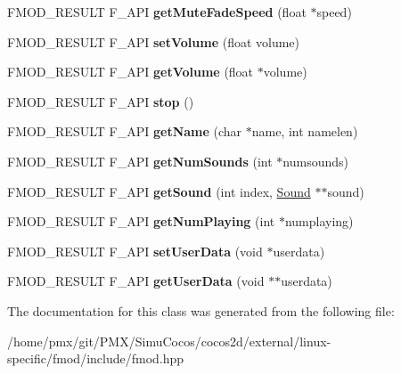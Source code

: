 \begin{DoxyCompactItemize}
\mbox{\label{classFMOD_1_1SoundGroup_aca310a25104400a3eb2988db655fe606}} 
F\+M\+O\+D\+\_\+\+R\+E\+S\+U\+LT F\+\_\+\+A\+PI {\bfseries get\+Mute\+Fade\+Speed} (float $\ast$speed)
\item 
\mbox{\label{classFMOD_1_1SoundGroup_a62bdee90b0493d4c881e6f34c7a7389d}} 
F\+M\+O\+D\+\_\+\+R\+E\+S\+U\+LT F\+\_\+\+A\+PI {\bfseries set\+Volume} (float volume)
\item 
\mbox{\label{classFMOD_1_1SoundGroup_a72cf877fa4dbc446c3b53afd84a93029}} 
F\+M\+O\+D\+\_\+\+R\+E\+S\+U\+LT F\+\_\+\+A\+PI {\bfseries get\+Volume} (float $\ast$volume)
\item 
\mbox{\label{classFMOD_1_1SoundGroup_a65f4d4a04d2f916c6287c185a2851746}} 
F\+M\+O\+D\+\_\+\+R\+E\+S\+U\+LT F\+\_\+\+A\+PI {\bfseries stop} ()
\item 
\mbox{\label{classFMOD_1_1SoundGroup_a3c1c4fa4a6fc7f7e688769ce594ccb1d}} 
F\+M\+O\+D\+\_\+\+R\+E\+S\+U\+LT F\+\_\+\+A\+PI {\bfseries get\+Name} (char $\ast$name, int namelen)
\item 
\mbox{\label{classFMOD_1_1SoundGroup_a48023bf29e1891b69ddc350b34db8c9b}} 
F\+M\+O\+D\+\_\+\+R\+E\+S\+U\+LT F\+\_\+\+A\+PI {\bfseries get\+Num\+Sounds} (int $\ast$numsounds)
\item 
\mbox{\label{classFMOD_1_1SoundGroup_a81b9002220c4b6b03d7252d7a1b20f20}} 
F\+M\+O\+D\+\_\+\+R\+E\+S\+U\+LT F\+\_\+\+A\+PI {\bfseries get\+Sound} (int index, \hyperlink{classFMOD_1_1Sound}{Sound} $\ast$$\ast$sound)
\item 
\mbox{\label{classFMOD_1_1SoundGroup_af88057e101e4dd2268d1a6f6656db75b}} 
F\+M\+O\+D\+\_\+\+R\+E\+S\+U\+LT F\+\_\+\+A\+PI {\bfseries get\+Num\+Playing} (int $\ast$numplaying)
\item 
\mbox{\label{classFMOD_1_1SoundGroup_a3315678b522baf2d74f732ab671f48c7}} 
F\+M\+O\+D\+\_\+\+R\+E\+S\+U\+LT F\+\_\+\+A\+PI {\bfseries set\+User\+Data} (void $\ast$userdata)
\item 
\mbox{\label{classFMOD_1_1SoundGroup_ac428e826a819030cbab7ffa666d7d9cd}} 
F\+M\+O\+D\+\_\+\+R\+E\+S\+U\+LT F\+\_\+\+A\+PI {\bfseries get\+User\+Data} (void $\ast$$\ast$userdata)
\end{DoxyCompactItemize}


The documentation for this class was generated from the following file\+:\begin{DoxyCompactItemize}
\item 
/home/pmx/git/\+P\+M\+X/\+Simu\+Cocos/cocos2d/external/linux-\/specific/fmod/include/fmod.\+hpp\end{DoxyCompactItemize}
